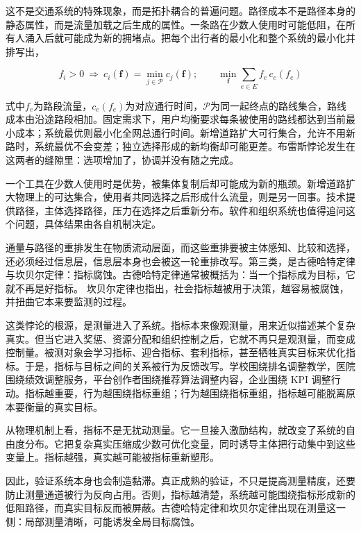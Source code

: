 这不是交通系统的特殊现象，而是拓扑耦合的普遍问题。路径成本不是路径本身的静态属性，而是流量加载之后生成的属性。一条路在少数人使用时可能低阻，在所有人涌入后就可能成为新的拥堵点。把每个出行者的最小化和整个系统的最小化并排写出，

\begin{equation}
f_i>0\ \Longrightarrow\ c_i(\mathbf f)=\min_{j\in\mathcal P}c_j(\mathbf f);
\qquad
\min_{\mathbf f}\sum_{e\in E}f_{e}\,c_{e}(f_{e})
\end{equation}

式中$f_e$为路段流量，$c_e(f_e)$为对应通行时间，$\mathcal P$为同一起终点的路线集合，路线成本由沿途路段相加。固定需求下，用户均衡要求每条被使用的路线都达到当前最小成本；系统最优则最小化全网总通行时间。新增道路扩大可行集合，允许不用新路时，系统最优不会变差；独立选择形成的新均衡却可能更差。布雷斯悖论发生在这两者的缝隙里：选项增加了，协调并没有随之完成。

一个工具在少数人使用时是优势，被集体复制后却可能成为新的瓶颈。新增道路扩大物理上的可达集合，使用者共同选择之后形成什么流量，则是另一回事。技术提供路径，主体选择路径，压力在选择之后重新分布。软件和组织系统也值得追问这个问题，具体结果由各自机制决定。


通量与路径的重排发生在物质流动层面，而这些重排要被主体感知、比较和选择，还必须经过信息层，信息层本身也会被这一轮重排改写。第三类，是古德哈特定律与坎贝尔定律：指标腐蚀。古德哈特定律通常被概括为：当一个指标成为目标，它就不再是好指标。\cite{goodhart1975problems} 坎贝尔定律也指出，社会指标越被用于决策，越容易被腐蚀，并扭曲它本来要监测的过程。\cite{campbell1979assessing}

这类悖论的根源，是测量进入了系统。指标本来像观测量，用来近似描述某个复杂真实。但当它进入奖惩、资源分配和组织控制之后，它就不再只是观测量，而变成控制量。被测对象会学习指标、迎合指标、套利指标，甚至牺牲真实目标来优化指标。于是，指标与目标之间的关系被行为反馈改写。学校围绕排名调整教学，医院围绕绩效调整服务，平台创作者围绕推荐算法调整内容，企业围绕 KPI 调整行动。指标越重要，行为越围绕指标重组；行为越围绕指标重组，指标越可能脱离原本要衡量的真实目标。

从物理机制上看，指标不是无扰动测量。它一旦接入激励结构，就改变了系统的自由度分布。它把复杂真实压缩成少数可优化变量，同时诱导主体把行动集中到这些变量上。指标越强，真实越可能被指标重新塑形。

因此，验证系统本身也会制造黏滞。真正成熟的验证，不只是提高测量精度，还要防止测量通道被行为反向占用。否则，指标越清楚，系统越可能围绕指标形成新的低阻路径，而真实目标反而被屏蔽。古德哈特定律和坎贝尔定律出现在测量这一侧：局部测量清晰，可能诱发全局目标腐蚀。

